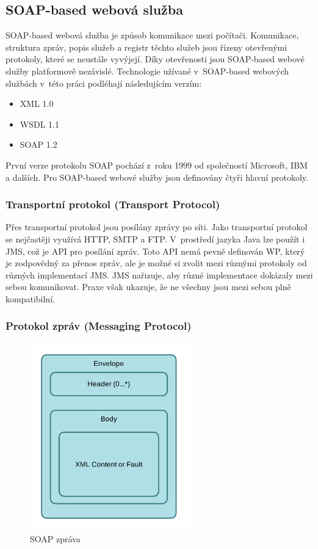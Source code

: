 \documentclass[11pt,twoside,a4paper]{book}
\begin{document}
\subsection{SOAP-based webová služba}

SOAP-based webová služba \cite{Kalin13} je způsob komunikace mezi počítači.
Komunikace, struktura zpráv, popis služeb a registr těchto služeb jsou řízeny otevřenými protokoly, které se
neustále vyvýjejí. Díky otevřenosti jsou SOAP-based webové služby platformově
nezávislé. Technologie užívané v~SOAP-based webových službách v~této práci
podléhají následujícím verzím:

\begin{itemize}
 \item XML 1.0
  \item WSDL 1.1
  \item SOAP 1.2
\end{itemize}

První verze protokolu SOAP pochází z~roku 1999 od společností Microsoft, IBM a
dalších. Pro SOAP-based webové služby jsou definovány čtyři hlavní protokoly.

\subsubsection{Transportní protokol (Transport Protocol)}

Přes transportní protokol jsou posílány zprávy po síti. Jako transportní
protokol se nejčastěji využívá HTTP, SMTP a FTP. V~prostředí jazyka Java lze
použít i JMS, což je API pro posílání zpráv. Toto API nemá pevně definován WP,
který je zodpovědný za přenos zpráv, ale je možné si zvolit mezi různými
protokoly od různých implementací JMS. JMS nařizuje, aby různé implementace
dokázaly mezi sebou komunikovat. Praxe však ukazuje, že ne všechny jsou mezi
sebou plně kompatibilní.

\subsubsection{Protokol zpráv (Messaging Protocol)}

\begin{figure}[h]
\begin{center}
\includegraphics[width=7cm]{images-pdf/soap.pdf} 
\caption{SOAP zpráva}
\label{fig:soap-zprava}
\end{center}
\end{figure}
\end{document}
